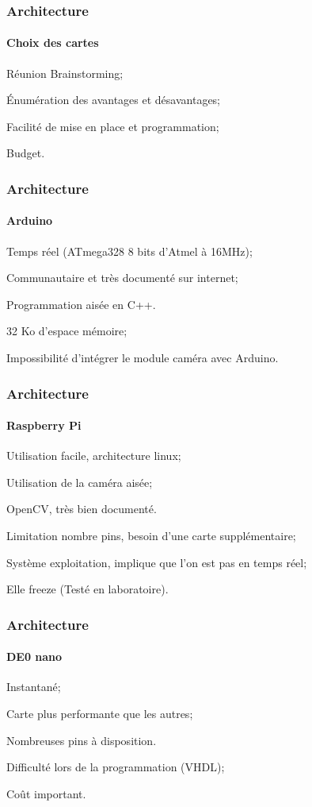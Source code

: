 \begin{frame}
\frametitle{Architecture}
\framesubtitle{Choix des cartes}
\begin{description}
	\item [Quelle carte choisir ?]
	\item Réunion Brainstorming;
	\item Énumération des avantages et désavantages;
	\item Facilité de mise en place et programmation;
	\item Budget.
\end{description}
\end{frame}

\begin{frame}
\frametitle{Architecture}
\framesubtitle{Arduino}
\begin{description}
	\item [Avantages]
	\item Temps réel (ATmega328 8 bits d'Atmel à 16MHz);
	\item Communautaire et très documenté sur internet;
	\item Programmation aisée en C++.
	\item [Désavantages]
	\item 32 Ko d'espace mémoire;
	\item Impossibilité d'intégrer le module caméra avec Arduino.
\end{description}
\end{frame}

\begin{frame}
\frametitle{Architecture}
\framesubtitle{Raspberry Pi}
\begin{description}
	\item [Avantages]
	\item Utilisation facile, architecture linux;
	\item Utilisation de la caméra aisée;
	\item OpenCV, très bien documenté.
	\item [Désavantages]
	\item Limitation nombre pins, besoin d'une carte supplémentaire;
	\item Système exploitation, implique que l'on est pas en temps réel; 
	\item Elle freeze (Testé en laboratoire).
\end{description}
\end{frame}

\begin{frame}
\frametitle{Architecture}
\framesubtitle{DE0 nano}
\begin{description}
	\item [Avantages]
	\item Instantané;
	\item Carte plus performante que les autres;
	\item Nombreuses pins à disposition.
	\item [Désavantages]
	\item Difficulté lors de la programmation (VHDL);
	\item Coût important.
\end{description}
\end{frame}

